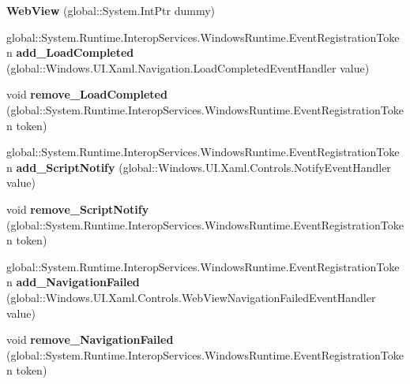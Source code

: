 \begin{DoxyCompactItemize}
{\bfseries Web\+View} (global\+::\+System.\+Int\+Ptr dummy)
\item 
\mbox{\label{class_windows_1_1_u_i_1_1_xaml_1_1_controls_1_1_web_view_a0563dd4525e20d9e5e5e3820e06dabcd}} 
global\+::\+System.\+Runtime.\+Interop\+Services.\+Windows\+Runtime.\+Event\+Registration\+Token {\bfseries add\+\_\+\+Load\+Completed} (global\+::\+Windows.\+U\+I.\+Xaml.\+Navigation.\+Load\+Completed\+Event\+Handler value)
\item 
\mbox{\label{class_windows_1_1_u_i_1_1_xaml_1_1_controls_1_1_web_view_acdebbf50fcaf701e5341abb5ca3fa7c8}} 
void {\bfseries remove\+\_\+\+Load\+Completed} (global\+::\+System.\+Runtime.\+Interop\+Services.\+Windows\+Runtime.\+Event\+Registration\+Token token)
\item 
\mbox{\label{class_windows_1_1_u_i_1_1_xaml_1_1_controls_1_1_web_view_a54bccbc6d255165ad4baa671cc7c26ca}} 
global\+::\+System.\+Runtime.\+Interop\+Services.\+Windows\+Runtime.\+Event\+Registration\+Token {\bfseries add\+\_\+\+Script\+Notify} (global\+::\+Windows.\+U\+I.\+Xaml.\+Controls.\+Notify\+Event\+Handler value)
\item 
\mbox{\label{class_windows_1_1_u_i_1_1_xaml_1_1_controls_1_1_web_view_ac99974ef564800b4ce687df69c6ad394}} 
void {\bfseries remove\+\_\+\+Script\+Notify} (global\+::\+System.\+Runtime.\+Interop\+Services.\+Windows\+Runtime.\+Event\+Registration\+Token token)
\item 
\mbox{\label{class_windows_1_1_u_i_1_1_xaml_1_1_controls_1_1_web_view_a821897d8daf66a762e290ec2f26a618d}} 
global\+::\+System.\+Runtime.\+Interop\+Services.\+Windows\+Runtime.\+Event\+Registration\+Token {\bfseries add\+\_\+\+Navigation\+Failed} (global\+::\+Windows.\+U\+I.\+Xaml.\+Controls.\+Web\+View\+Navigation\+Failed\+Event\+Handler value)
\item 
\mbox{\label{class_windows_1_1_u_i_1_1_xaml_1_1_controls_1_1_web_view_ae13455a3000672cc979f6f33f5928195}} 
void {\bfseries remove\+\_\+\+Navigation\+Failed} (global\+::\+System.\+Runtime.\+Interop\+Services.\+Windows\+Runtime.\+Event\+Registration\+Token token)

\end{DoxyCompactItemize}
